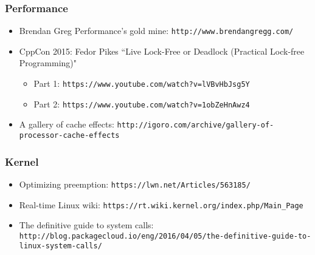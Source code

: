 \begin{frame}[fragile]
  \frametitle{Performance}

  \begin{itemize}
  \item Brendan Greg Performance's gold mine: \verb+http://www.brendangregg.com/+
  \item CppCon 2015: Fedor Pikes “Live Lock-Free or Deadlock (Practical Lock-free Programming)"
    \begin{itemize}
    \item Part 1: \verb+https://www.youtube.com/watch?v=lVBvHbJsg5Y+
    \item Part 2: \verb+https://www.youtube.com/watch?v=1obZeHnAwz4+
    \end{itemize}
  \item A gallery of cache effects: \footnotesize\verb+http://igoro.com/archive/gallery-of-processor-cache-effects+
  \end{itemize}
\end{frame}

\begin{frame}[fragile]
  \frametitle{Kernel}

  \begin{itemize}
  \item Optimizing preemption: \verb+https://lwn.net/Articles/563185/+
  \item Real-time Linux wiki: \verb+https://rt.wiki.kernel.org/index.php/Main_Page+
    \item The definitive guide to system calls: \tiny\verb+http://blog.packagecloud.io/eng/2016/04/05/the-definitive-guide-to-linux-system-calls/+
  \end{itemize}
\end{frame}
